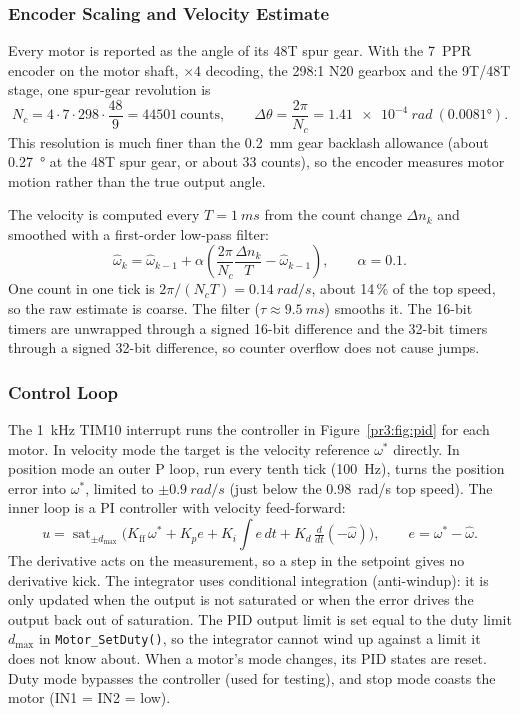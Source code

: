 \documentclass[12pt,a4paper]{article}
\begin{document}
\subsubsection{Encoder Scaling and Velocity Estimate}

Every motor is reported as the angle of its 48T spur gear. With the 7~PPR encoder on the
motor shaft, $\times4$ decoding, the 298:1 N20 gearbox and the 9T/48T stage, one spur-gear
revolution is
\begin{equation}
  N_c = 4 \cdot 7 \cdot 298 \cdot \frac{48}{9} = \num{44501}\ \text{counts},
  \qquad \Delta\theta = \frac{2\pi}{N_c} = \SI{1.41e-4}{rad}\ (\ang{0.0081}).
  \label{pr3:eq:cpr}
\end{equation}
This resolution is much finer than the \SI{0.2}{mm} gear backlash allowance (about
\SI{0.27}{\degree} at the 48T spur gear, or about 33 counts), so the encoder measures motor
motion rather than the true output angle.

The velocity is computed every $T=\SI{1}{ms}$ from the count change $\Delta n_k$ and smoothed
with a first-order low-pass filter:
\begin{equation}
  \hat\omega_k = \hat\omega_{k-1} + \alpha\left(\frac{2\pi}{N_c}\frac{\Delta n_k}{T}-\hat\omega_{k-1}\right),
  \qquad \alpha = 0.1 .
\end{equation}
One count in one tick is $2\pi/(N_c T)=\SI{0.14}{rad/s}$, about 14\,\% of the top speed, so the
raw estimate is coarse. The filter ($\tau\approx\SI{9.5}{ms}$) smooths it. The 16-bit
timers are unwrapped through a signed 16-bit difference and the 32-bit timers through a
signed 32-bit difference, so counter overflow does not cause jumps.

\subsubsection{Control Loop}

The \SI{1}{kHz} TIM10 interrupt runs the controller in Figure~\ref{pr3:fig:pid} for each motor.
In velocity mode the target is the velocity reference $\omega^*$ directly. In position mode
an outer P loop, run every tenth tick (\SI{100}{Hz}), turns the position error into
$\omega^*$, limited to $\pm\SI{0.9}{rad/s}$ (just below the \SI{0.98}{rad/s} top speed).
The inner loop is a PI controller with velocity feed-forward:
\begin{equation}
  u = \operatorname{sat}_{\pm d_\text{max}}\!\Big(K_\text{ff}\,\omega^* + K_p e + K_i\!\int e\,dt + K_d\,\tfrac{d}{dt}(-\hat\omega)\Big),
  \qquad e = \omega^*-\hat\omega .
\end{equation}
The derivative acts on the measurement, so a step in the setpoint gives no derivative kick.
The integrator uses conditional integration (anti-windup): it is only updated when the output
is not saturated or when the error drives the output back out of saturation. The PID output
limit is set equal to the duty limit $d_\text{max}$ in \texttt{Motor\_SetDuty()}, so the
integrator cannot wind up against a limit it does not know about. When a motor's mode
changes, its PID states are reset. Duty mode bypasses the controller (used for testing),
and stop mode coasts the motor (IN1 = IN2 = low).
\end{document}
